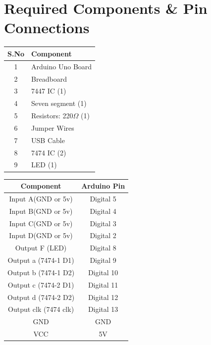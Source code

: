 \documentclass[a4paper,12pt]{article}
\begin{document}
\section*{Required Components \& Pin Connections}
\begin{center}
\begin{minipage}{0.45\textwidth}
\begin{table}[H]
\centering
\begin{tabular}{|c|l|}
\hline
\textbf{S.No} & \textbf{Component} \\ \hline
1 & Arduino Uno Board \\
2 & Breadboard \\
3 & 7447 IC (1) \\
4 & Seven segment (1) \\
5 & Resistors: 220$\Omega$ (1) \\
6 & Jumper Wires \\
7 & USB Cable \\
8 & 7474 IC (2) \\
9 & LED (1) \\
\hline
\end{tabular}
\end{table}
\end{minipage}
\hspace{0.05\textwidth}
\begin{minipage}{0.45\textwidth}
\begin{table}[H]
\centering
\begin{tabular}{|c|c|}
\hline
\textbf{Component} & \textbf{Arduino Pin} \\ \hline
Input A(GND or 5v) & Digital 5 \\
Input B(GND or 5v) & Digital 4 \\
Input C(GND or 5v) & Digital 3 \\
Input D(GND or 5v) & Digital 2 \\
Output F (LED) & Digital 8 \\
Output a (7474-1 D1) & Digital 9 \\
Output b (7474-1 D2) & Digital 10 \\
Output c (7474-2 D1) & Digital 11 \\
Output d (7474-2 D2) & Digital 12 \\
Output clk (7474 clk) & Digital 13 \\
GND & GND \\
VCC & 5V \\
\hline
\end{tabular}
\end{table}
\end{minipage}
\end{center}
\end{document}
